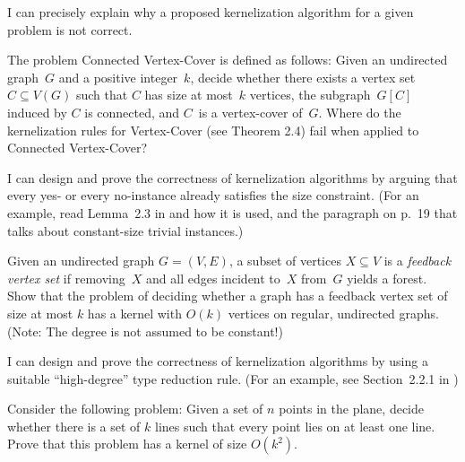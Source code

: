 \documentclass[english]{uebung_cs}
\begin{document}

\instructions

\begin{skill}
  I can precisely explain why a proposed kernelization algorithm for a given problem is not correct.
\end{skill}

\begin{exercise}
  \label{ex:CVC}
  The problem Connected Vertex-Cover is defined as follows: Given an undirected graph~$G$ and a positive integer~$k$, decide whether there exists a vertex set $C\subseteq V(G)$ such that $C$ has size at most~$k$ vertices, the subgraph~$G[C]$ induced by $C$ is connected, and $C$~is a vertex-cover of~$G$.
  Where do the kernelization rules for Vertex-Cover (see Theorem 2.4) fail when applied to Connected Vertex-Cover?
\end{exercise}


\begin{skill}
  I can design and prove the correctness of kernelization algorithms by arguing that every yes- or every no-instance already satisfies the size constraint.
  \normalfont (For an example, read Lemma~2.3 in \cygan{} and how it is used, and the paragraph on p.~19 that talks about constant-size trivial instances.)
\end{skill}

\begin{exercise}
  Given an undirected graph $G = (V, E)$, a subset of vertices $X \subseteq V$ is a \emph{feedback vertex
    set} if removing~$X$ and all edges incident to~$X$ from~$G$ yields a forest. Show that the problem of deciding
  whether a graph has a feedback vertex set of size at most $k$ has a kernel with $O(k)$ vertices on regular,
  undirected graphs. (Note: The degree is not assumed to be constant!)
\end{exercise}

\begin{skill}
  I can design and prove the correctness of kernelization algorithms by using a suitable \enquote{high-degree} type reduction rule.
  \normalfont (For an example, see Section~2.2.1 in \cygan{})
\end{skill}

\begin{exercise}
  Consider the following problem: Given a set of $n$ points in the plane, decide whether
  there is a set of $k$ lines such that every point lies on at least one line. Prove that this problem has a
  kernel of size $O(k^2)$.
\end{exercise}%
\end{document}
